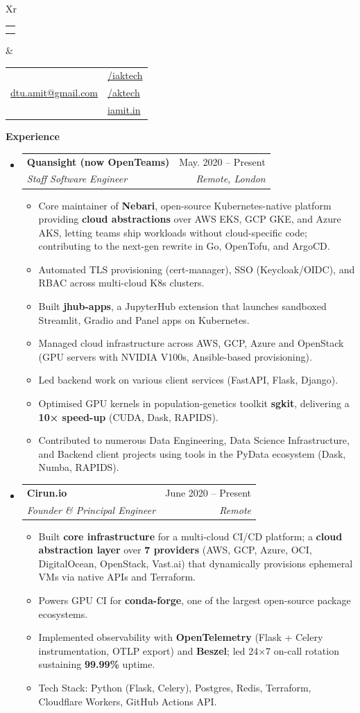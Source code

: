 \documentclass[letterpaper,12pt]{article}[leftmargin=*]
\makeatletter
\def \fullname {Amit Kumar}
\def \subtitle {}
\def \linkedinicon {\faLinkedin}
\def \linkedinlink {https://linkedin.com/in/iaktech/}
\def \linkedintext {/iaktech}
\def \phoneicon {\faPhone}
\def \phonetext {+44-7904-296-365}
\def \emailicon {\faEnvelope}
\def \emaillink {mailto:dtu.amit@gmail.com}
\def \emailtext {dtu.amit@gmail.com}
\def \githubicon {\faGithub}
\def \githublink {https://github.com/aktech}
\def \githubtext {/aktech}
\def \websiteicon {\faGlobe}
\def \websitelink {https://iamit.in/}
\def \websitetext {iamit.in}
\def \headertype {\doublecol} %
\def \entryspacing {-0pt}
\def \linkedin {\linkedinicon \hspace{3pt}\href{\linkedinlink}{\linkedintext}}
\def \phone {\phoneicon \hspace{3pt}{ \phonetext}}
\def \email {\emailicon \hspace{3pt}\href{\emaillink}{\emailtext}}
\def \github {\githubicon \hspace{3pt}\href{\githublink}{\githubtext}}
\def \website {\websiteicon \hspace{3pt}\href{\websitelink}{\websitetext}}
\renewcommand{\section}[2]{\vspace{5pt}
  \colorbox{secondary}{\color{white}\raggedbottom\normalsize\textbf{{#1}{\hspace{7pt}#2}}}
}
\newcommand{\resumeEntryStart}{\begin{itemize}[leftmargin=2.5mm]}
\newcommand{\resumeEntryEnd}{\end{itemize}\vspace{\entryspacing}}
\newcommand{\resumeItemListStart}{\begin{itemize}[leftmargin=4.5mm]}
\newcommand{\resumeItemListEnd}{\end{itemize}}
\newcommand{\resumeItem}[1]{
  \item{\small #1\par}\vspace{-2pt}
}
\newcommand{\resumeEntryTSDL}[4]{
  \vspace{-1pt}\item[]
    \begin{tabularx}{0.97\textwidth}{X@{\hspace{60pt}}r}
      \textbf{\color{primary}#1} & {\firabook\color{accent}\small#2} \\
      \textit{\color{accent}\small#3} & \textit{\color{accent}\small#4} \\
    \end{tabularx}\vspace{-6pt}
}
\newcommand{\doublecol}[6]{
  \begin{tabularx}{\textwidth}{Xr}
    {
      \begin{tabular}[c]{l}
        \fontsize{35}{45}\selectfont{\color{primary}{{\textbf{\fullname}}}} \\
        {\textit{\subtitle}} %
      \end{tabular}
    } & {
      \begin{tabular}[c]{l@{\hspace{1.5em}}l}
        {\small#4} & {\small#1} \\
        {\small#5} & {\small#2} \\
        {\small#6} & {\small#3}
      \end{tabular}
    }
  \end{tabularx}
}
\newcommand{\singlecol}[6]{
  \begin{tabularx}{\textwidth}{Xr}
    {
      \begin{tabular}[b]{l}
        \fontsize{35}{45}\selectfont{\color{primary}{{\textbf{\fullname}}}} \\
        {\textit{\subtitle}} %
      \end{tabular}
    } & {
      \begin{tabular}[c]{l}
        {\small#1} \\
        {\small#2} \\
        {\small#3} \\
        {\small#4} \\
        {\small#5} \\
        {\small#6}
      \end{tabular}
    }
  \end{tabularx}
}
\makeatother
\begin{document}


\headertype{\linkedin}{\github}{\website}{\phone}{\email}{} %
\vspace{-10pt} %

\section{\faPieChart}{Experience}

  \resumeEntryStart
    \resumeEntryTSDL
      {Quansight (now OpenTeams)}{May. 2020 -- Present}
      {Staff Software Engineer}{Remote, London}
    \resumeItemListStart
    \resumeItem{Core maintainer of \textbf{Nebari}, open-source Kubernetes-native platform providing \textbf{cloud abstractions} over AWS EKS, GCP GKE, and Azure AKS, letting teams ship workloads without cloud-specific code; contributing to the next-gen rewrite in Go, OpenTofu, and ArgoCD.}
    \resumeItem{Automated TLS provisioning (cert-manager), SSO (Keycloak/OIDC), and RBAC across multi-cloud K8s clusters.}
    \resumeItem{Built \textbf{jhub-apps}, a JupyterHub extension that launches sandboxed Streamlit, Gradio and Panel apps on Kubernetes.}
    \resumeItem{Managed cloud infrastructure across AWS, GCP, Azure and OpenStack (GPU servers with NVIDIA V100s, Ansible-based provisioning).}
    \resumeItem{Led backend work on various client services (FastAPI, Flask, Django).}
    \resumeItem{Optimised GPU kernels in population-genetics toolkit \textbf{sgkit}, delivering a \textbf{10× speed-up} (CUDA, Dask, RAPIDS).}
    \resumeItem{Contributed to numerous Data Engineering, Data Science Infrastructure, and Backend client projects using tools in the PyData ecosystem (Dask, Numba, RAPIDS).}
    \resumeItemListEnd
  \resumeEntryEnd

\resumeEntryStart
  \resumeEntryTSDL
    {Cirun.io}{June 2020 -- Present}
    {Founder \& Principal Engineer}{Remote}
  \resumeItemListStart
    \resumeItem{Built \textbf{core infrastructure} for a multi-cloud CI/CD platform; a \textbf{cloud abstraction layer} over \textbf{7 providers} (AWS, GCP, Azure, OCI, DigitalOcean, OpenStack, Vast.ai) that dynamically provisions ephemeral VMs via native APIs and Terraform.}
    \resumeItem{Powers GPU CI for \textbf{conda-forge}, one of the largest open-source package ecosystems.}
    \resumeItem{Implemented observability with \textbf{OpenTelemetry} (Flask + Celery instrumentation, OTLP export) and \textbf{Beszel}; led 24×7 on-call rotation sustaining \textbf{99.99\%} uptime.}
    \resumeItem{Tech Stack: Python (Flask, Celery), Postgres, Redis, Terraform, Cloudflare Workers, GitHub Actions API.}
  \resumeItemListEnd
\resumeEntryEnd
\end{document}
